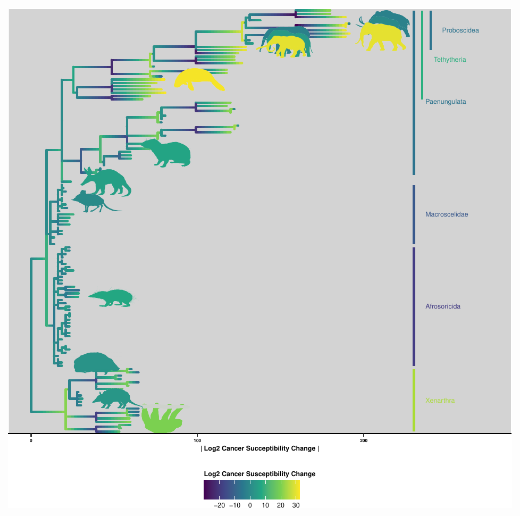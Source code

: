 \documentclass[]{elsarticle} %
\let\origfigure\figure
\let\endorigfigure\endfigure
\renewenvironment{figure}[1][2] {
    \expandafter\origfigure\expandafter[H]
} {
    \endorigfigure
}
\begin{document}
\begin{figure}[H]
\includegraphics[width=6in,]{paper_PLOS_draft_files/figure-latex/Figure-CancerSuscept-1} \caption{Cancer succecptibility across \emph{Atlantogenata.} Branch lengths are set to the magnitude of change in cancer succeptiblity; colors indicate the magnitude and direction of the change.}\label{fig:Figure-CancerSuscept}
\end{figure}
\end{document}
